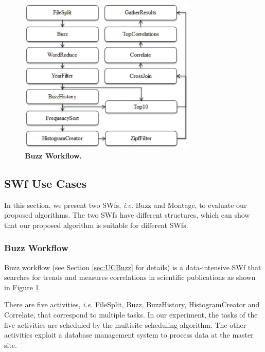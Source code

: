\begin{figure}
\begin{centering}
\captionsetup{justification=centering}
\includegraphics[width=84mm]{figures/Buzz}
\par\end{centering}
\caption{\textbf{Buzz Workflow.}}
\label{fig:buzz}
\end{figure}

\subsection{SWf Use Cases}

In this section, we present two SWfs, \textit{i.e.} Buzz and Montage, to evaluate our proposed algorithms. The two SWfs have different structures, which can show that our proposed algorithm is suitable for different SWfs.

\subsubsection{Buzz Workflow}
Buzz workflow (see Section \ref{sec:UCBuzz} for details) is a data-intensive SWf that searches for trends and measures correlations in scientific publications as shown in Figure \ref{fig:buzz}. 

There are five activities, \textit{i.e.} FileSplit, Buzz, BuzzHistory, HistogramCreator and Correlate, that correspond to multiple tasks. In our experiment, the tasks of the five activities are scheduled by the multisite scheduling algorithm. The other activities exploit a database management system to process data at the master site.


